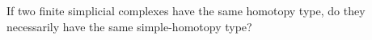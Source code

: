 If two finite simplicial complexes have the same homotopy type, do they necessarily have the same simple-homotopy type?
